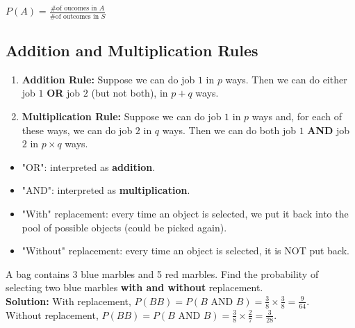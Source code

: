 \begin{remark}
    $\displaystyle P(A) = \frac{\text{\# of oucomes in $A$}}{\text{\# of outcomes in $S$}}$
\end{remark}

\subsection{Addition and Multiplication Rules}

\begin{definition}
    \phantom{}
    \begin{enumerate}
        \item \textbf{Addition Rule:} Suppose we can do job $1$ in $p$ ways.
        Then we can do either job $1$ \textbf{OR} job $2$ (but not both), in $p + q$ ways.
        \item \textbf{Multiplication Rule:} Suppose we can do job $1$ in $p$ ways and,
        for each of these ways, we can do job $2$ in $q$ ways. Then we can do both
        job $1$ \textbf{AND} job $2$ in $p \times q$ ways.
    \end{enumerate}
\end{definition}

\begin{note}
    \phantom{}
    \begin{itemize}
        \item "OR": interpreted as \textbf{addition}.
        \item "AND": interpreted as \textbf{multiplication}.
        \item "With" replacement: every time an object is selected, we put it back into the pool of possible objects (could be picked again).
        \item "Without" replacement: every time an object is selected, it is NOT put back.
    \end{itemize}
\end{note}

\begin{example}
    A bag contains 3 blue marbles and 5 red marbles. Find the probability of selecting two blue marbles \textbf{with and without} replacement.  \\
    \textbf{Solution: } With replacement, $P(BB) = P(B \text{ AND } B) = \frac{3}{8} \times \frac{3}{8} = \frac{9}{64}$.    \\
    Without replacement, $P(BB) = P(B \text{ AND } B) = \frac{3}{8} \times \frac{2}{7} = \frac{3}{28}$.
\end{example}


